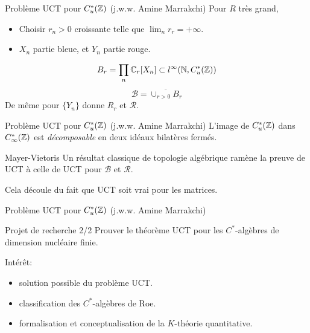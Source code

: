 \begin{frame}{Probl\`eme UCT pour $C^*_u(\mathbb Z)$ (j.w.w. Amine Marrakchi)}
Pour $R$ tr\`es grand,
\begin{center}
\end{center}
\begin{itemize}
\item Choisir $r_n>0$ croissante telle que $\lim_n r_r = +\infty$.
\item $X_n$ partie bleue, et $Y_n$ partie rouge.
\end{itemize}
\[ B_r= \prod_n \mathbb C_r[X_n] \subset l^\infty (\mathbb N , C^*_u(\mathbb Z))\]
\[\mathcal B = \overline{\cup_{r>0} B_r}\]
De m\^eme pour $\{Y_n\}$ donne $R_r$ et $\mathcal R$.
\end{frame}

\begin{frame}{Probl\`eme UCT pour $C^*_u(\mathbb Z)$ (j.w.w. Amine Marrakchi)}
L'image de $C^*_u(\mathbb Z)$ dans $C^*_\infty(\mathbb Z)$ est \textit{d\'ecomposable} en deux id\'eaux bilat\`eres ferm\'es.
\vfill
\begin{block}{Mayer-Vietoris}
Un r\'esultat classique de topologie alg\'ebrique ram\`ene la preuve de UCT \`a celle de UCT pour $\mathcal B$ et $\mathcal R$.
\end{block}
\vfill
Cela d\'ecoule du fait que UCT soit vrai pour les matrices.
\end{frame}

\begin{frame}{Probl\`eme UCT pour $C^*_u(\mathbb Z)$ (j.w.w. Amine Marrakchi)}
\begin{block}{Projet de recherche 2/2}
Prouver le th\'eor\`eme UCT pour les $C^*$-alg\`ebres de dimension nucl\'eaire finie.
\end{block}
\vfill
Int\'er\^et: 
\vfill
\begin{itemize}
\item solution possible du probl\`eme UCT.
\vfill
\item classification des $C^*$-alg\`ebres de Roe.
\vfill
\item formalisation et conceptualisation de la $K$-th\'eorie quantitative.
\vfill
\end{itemize}
\end{frame}